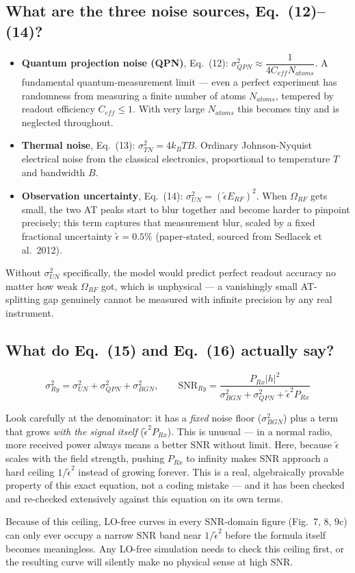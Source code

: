 \documentclass[11pt]{article}
\begin{document}
\subsection*{What are the three noise sources, Eq.~(12)--(14)?}
\begin{itemize}
\item \textbf{Quantum projection noise (QPN)}, Eq.~(12): $\sigma_{QPN}^2\approx \dfrac{1}{4C_{eff}N_{atoms}}$. A fundamental quantum-measurement limit --- even a perfect experiment has randomness from measuring a finite number of atoms $N_{atoms}$, tempered by readout efficiency $C_{eff}\le1$. With very large $N_{atoms}$ this becomes tiny and is neglected throughout.
\item \textbf{Thermal noise}, Eq.~(13): $\sigma_{TN}^2=4k_BTB$. Ordinary Johnson-Nyquist electrical noise from the classical electronics, proportional to temperature $T$ and bandwidth $B$.
\item \textbf{Observation uncertainty}, Eq.~(14): $\sigma_{UN}^2=(\tilde\epsilon E_{RF})^2$. When $\Omega_{RF}$ gets small, the two AT peaks start to blur together and become harder to pinpoint precisely; this term captures that measurement blur, scaled by a fixed fractional uncertainty $\tilde\epsilon=0.5\%$ (paper-stated, sourced from Sedlacek et al.\ 2012).
\end{itemize}
\begin{ifnot}
Without $\sigma_{UN}^2$ specifically, the model would predict perfect readout accuracy no matter how weak $\Omega_{RF}$ got, which is unphysical --- a vanishingly small AT-splitting gap genuinely cannot be measured with infinite precision by any real instrument.
\end{ifnot}

\subsection*{What do Eq.~(15) and Eq.~(16) actually say?}
\[
\sigma_{Ry}^2=\sigma_{UN}^2+\sigma_{QPN}^2+\sigma_{BGN}^2, \qquad
\text{SNR}_{Ry}=\frac{P_{Rx}|h|^2}{\sigma_{BGN}^2+\sigma_{QPN}^2+\tilde\epsilon^2 P_{Rx}}
\]
\begin{eqmeaning}
Look carefully at the denominator: it has a \emph{fixed} noise floor ($\sigma_{BGN}^2$) plus a term that grows \emph{with the signal itself} ($\tilde\epsilon^2P_{Rx}$). This is unusual --- in a normal radio, more received power always means a better SNR without limit. Here, because $\tilde\epsilon$ scales with the field strength, pushing $P_{Rx}$ to infinity makes SNR approach a hard ceiling $1/\tilde\epsilon^2$ instead of growing forever. This is a real, algebraically provable property of this exact equation, not a coding mistake --- and it has been checked and re-checked extensively against this equation on its own terms.
\end{eqmeaning}
\begin{simuse}
Because of this ceiling, LO-free curves in every SNR-domain figure (Fig.~7, 8, 9c) can only ever occupy a narrow SNR band near $1/\tilde\epsilon^2$ before the formula itself becomes meaningless. Any LO-free simulation needs to check this ceiling first, or the resulting curve will silently make no physical sense at high SNR.
\end{simuse}
\end{document}
